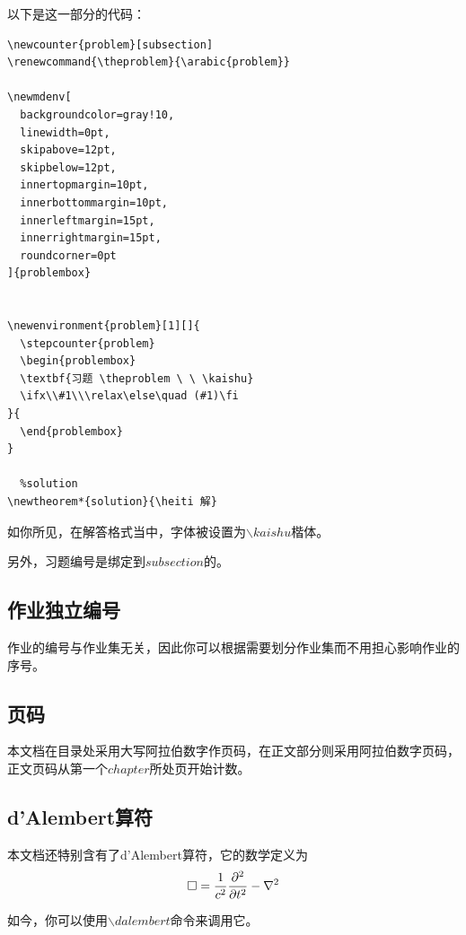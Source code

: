\documentclass{template}
\begin{document}
\begin{solution}
    以下是这一部分的代码：
    \begin{lstlisting}[title=\ ,frame=single]
  %problem
\newcounter{problem}[subsection]
\renewcommand{\theproblem}{\arabic{problem}}

\newmdenv[
  backgroundcolor=gray!10, 
  linewidth=0pt,
  skipabove=12pt,
  skipbelow=12pt, 
  innertopmargin=10pt,
  innerbottommargin=10pt,
  innerleftmargin=15pt,
  innerrightmargin=15pt,
  roundcorner=0pt
]{problembox} 


\newenvironment{problem}[1][]{
  \stepcounter{problem}
  \begin{problembox}
  \textbf{习题 \theproblem \ \ \kaishu}
  \ifx\\#1\\\relax\else\quad (#1)\fi
}{
  \end{problembox}
}

  %solution
\newtheorem*{solution}{\heiti 解}
    \end{lstlisting}
\end{solution}

如你所见，在解答格式当中，字体被设置为$\backslash kaishu$楷体。

另外，习题编号是绑定到$subsection$的。
\subsection{作业独立编号}
作业的编号与作业集无关，因此你可以根据需要划分作业集而不用担心影响作业的序号。
\subsection{页码}
本文档在目录处采用大写阿拉伯数字作页码，在正文部分则采用阿拉伯数字页码，正文页码从第一个$chapter$所处页开始计数。
\subsection{d'Alembert算符}
本文档还特别含有了d'Alembert算符，它的数学定义为
\[\mathop{}\!\square=\frac{1}{c^2}\frac{\partial^2}{\partial t^2}-\nabla^2\]

如今，你可以使用$\backslash dalembert$命令来调用它。
\end{document}
